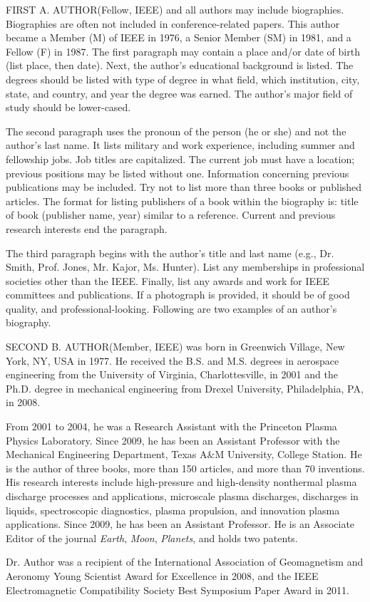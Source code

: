 \documentclass{IEEEjmw}
\begin{document}
\begin{IEEEbiography}{FIRST A. AUTHOR}{\space}(Fellow, IEEE) and all authors may include biographies. Biographies are often not included in conference-related papers. This author became a Member (M) of IEEE in 1976, a Senior Member (SM) in 1981, and a Fellow (F) in 1987. The first paragraph may contain a place and/or date of birth (list place, then date). Next, the author's educational background is listed. The degrees should be listed with type of degree in what field, which institution, city, state, and country, and year the degree was earned. The author's major field of study should be lower-cased.

The second paragraph uses the pronoun of the person (he or she) and not the author's last name. It lists military and work experience, including summer and fellowship jobs. Job titles are capitalized. The current job must have a location; previous positions may be listed without one. Information concerning previous publications may be included. Try not to list more than three books or published articles. The format for listing publishers of a book within the biography is: title of book (publisher name, year) similar to a reference. Current and previous research interests end the paragraph.

The third paragraph begins with the author's title and last name (e.g., Dr. Smith, Prof. Jones, Mr. Kajor, Ms. Hunter). List any memberships in professional societies other than the IEEE. Finally, list any awards and work for IEEE committees and publications. If a photograph is provided, it should be of good quality, and professional-looking. Following are two examples of an author's biography.
\end{IEEEbiography}

\begin{IEEEbiography}{SECOND B. AUTHOR}{\space}(Member, IEEE) was born in Greenwich Village, New York, NY, USA in 1977. He received the B.S. and M.S. degrees in aerospace engineering from the University of Virginia, Charlottesville, in 2001 and the Ph.D. degree in mechanical engineering from Drexel University, Philadelphia, PA, in 2008.

    From 2001 to 2004, he was a Research Assistant with the Princeton Plasma Physics Laboratory. Since 2009, he has been an Assistant Professor with the Mechanical Engineering Department, Texas A\&M University, College Station.\vadjust{\vfill\pagebreak} He is the author of three books, more than 150 articles, and more than 70 inventions. His research interests include high-pressure and high-density nonthermal plasma discharge processes and applications, microscale plasma discharges, discharges in liquids, spectroscopic diagnostics, plasma propulsion, and innovation plasma applications. Since  2009,  he  has  been  an  Assistant  Professor. He is an Associate Editor of the journal {\it Earth}, {\it Moon}, {\it Planets}, and holds two patents. 

   Dr. Author was a recipient of the International Association of Geomagnetism and Aeronomy Young Scientist Award for Excellence in 2008, and the IEEE Electromagnetic Compatibility Society Best Symposium Paper Award in 2011. 
\end{IEEEbiography}
\end{document}
